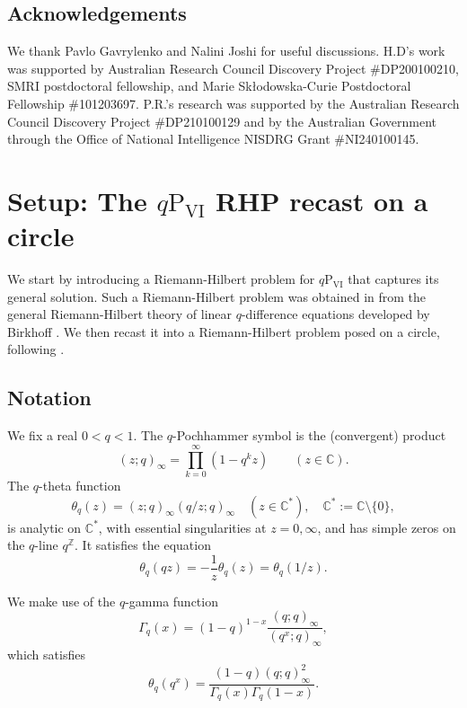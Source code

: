 \documentclass[a4paper,reqno,11pt]{amsart}
\numberwithin{equation}{section}
\numberwithin{figure}{section}
\theoremstyle{plain}
\theoremstyle{remark}
\newcommand\Psix{\textrm{P}_{\textrm{VI}}}
\numberwithin{rhp}{section}
\begin{document}
\subsection{Acknowledgements}
We thank Pavlo Gavrylenko and Nalini Joshi for useful discussions.  H.D's work was supported by Australian Research Council Discovery Project \#DP200100210, SMRI postdoctoral fellowship, and Marie Skłodowska-Curie Postdoctoral Fellowship \#101203697. P.R.'s research was supported by the
Australian Research Council Discovery Project \#DP210100129 and by the Australian Government through the Office of National Intelligence NISDRG Grant
\#NI240100145.



\section{Setup: The $q\Psix$ RHP recast on a circle} \label{sec:setup}
We start by introducing a Riemann-Hilbert problem for $q\Psix$ that captures its general solution. Such a Riemann-Hilbert problem was obtained in \cite{joshi_rof_qpvi} from the general Riemann-Hilbert theory of linear $q$-difference equations developed by Birkhoff \cite{birkhoff1913}. We then recast it into a Riemann-Hilbert problem posed on a circle, following \cite{roffelsen2024segre}.


\subsection{Notation}
We fix a real $0<q<1$.
The $q$-Pochhammer symbol is the (convergent) product
\begin{equation*}
(z;q)_\infty=\prod_{k=0}^{\infty}{(1-q^kz)}\qquad (z\in\mathbb{C}).
\end{equation*}
 The $\mathit{q}$-theta function 
\begin{equation}\label{eq:thetasym}
\theta_q(z)=(z;q)_\infty(q/z;q)_\infty\quad (z\in \mathbb{C}^*),\quad \mathbb{C}^*:=\mathbb{C}\setminus\{0\},
\end{equation}
is analytic on $\mathbb{C}^*$, with essential singularities at $z=0, \infty$, and has simple zeros on the $q$-line $q^\mathbb{Z}$. It satisfies the equation
\begin{equation}\label{eq:qtheta_identities}
\theta_q(qz)=-\frac{1}{z}\theta_q(z)=\theta_q(1/z).
\end{equation}

We make use of the $q$-gamma function
\begin{equation*}
    \Gamma_q(x)=(1-q)^{1-x}\frac{(q;q)_\infty}{(q^x;q)_\infty},
\end{equation*}
which satisfies
\begin{equation}\label{def:thetaq}
\theta_q(q^x)=\frac{(1-q)(q;q)_\infty^2}{\Gamma_q(x)\Gamma_q(1-x)}.
\end{equation}
\end{document}
